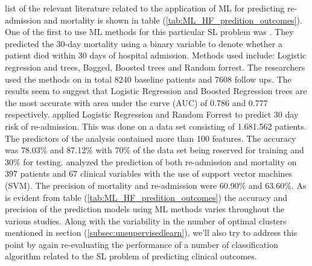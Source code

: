\documentclass[../thesis.tex]{subfiles}
\begin{document}


\noindent list of the relevant literature related to the application of ML for predicting re-admission and mortality is shown in table (\ref{tab:ML_HF_predition_outcomes}). One of the first to use ML methods for this particular SL problem was \cite{austin2012regression}. They predicted the 30-day mortality using a binary variable to denote whether a patient died within 30 days of hospital admission. Methods used include: Logistic regression and trees, Bagged, Boosted trees and Random forrest. The researchers used the methods on in total 8240 baseline patients and 7608 follow ups. The results seem to suggest that Logistic Regression and Boosted Regression trees are the most accurate with area under the curve (AUC) of 0.786 and 0.777 respectively. \cite{zolfaghar2013big} applied Logistic Regression and Random Forrest to predict 30 day risk of re-admission. This was done on a data set consisting of 1.681.562 patients. The predictors of the analysis contained more than 100 features. The accuracy was 78.03\% and 87.12\% with 70\% of the data set being reserved for training and 30\% for testing. \cite{shah2014phenomapping} analyzed the prediction of both re-admission and mortality on 397 patients and 67 clinical variables with the use of support vector machines (SVM). The precision of mortality and re-admission were 60.90\% and 63.60\%. As is evident from table (\ref{tab:ML_HF_predition_outcomes}) the accuracy and precision of the prediction models using ML methods varies throughout the various studies. Along with the variability in the number of optimal clusters mentioned in section (\ref{subsec:unsupervisedlearn}), we'll also try to address this point by again re-evaluating the performance of a number of classification algorithm related to the SL problem of predicting clinical outcomes. 
\end{document}
